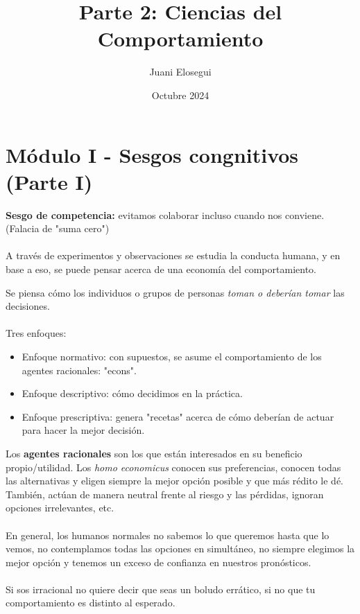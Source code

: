 \documentclass{article}
\title{Parte 2: Ciencias del Comportamiento}
\author{Juani Elosegui}
\date{Octubre 2024}
\begin{document}
\maketitle

    \section*{Módulo I - Sesgos congnitivos (Parte I)}
        \textbf{Sesgo de competencia:} evitamos colaborar incluso cuando nos conviene. (Falacia de "suma cero")
        \\
        \\
        A través de experimentos y observaciones se estudia la conducta humana, y en base a eso, se puede pensar acerca de una economía del comportamiento.

        Se piensa cómo los individuos o grupos de personas \emph{toman o deberían tomar} las decisiones.
        \\
        \\
        Tres enfoques:
        \begin{itemize}
            \item Enfoque normativo: con supuestos, se asume el comportamiento de los agentes racionales: "econs".
            \item Enfoque descriptivo: cómo decidimos en la práctica.
            \item Enfoque prescriptiva: genera "recetas" acerca de cómo deberían de actuar para hacer la mejor decisión.
        \end{itemize}
        Los \textbf{agentes racionales} son los que están interesados en su beneficio propio/utilidad. Los \emph{homo economicus} conocen sus preferencias, conocen todas las alternativas y eligen siempre la mejor opción posible y que más rédito le dé.
        \\
        También, actúan de manera neutral frente al riesgo y las pérdidas, ignoran opciones irrelevantes, etc.
        \\
        \\
        En general, los humanos normales no sabemos lo que queremos hasta que lo vemos, no contemplamos todas las opciones en simultáneo, no siempre elegimos la mejor opción y tenemos un exceso de confianza en nuestros pronósticos.
        \\
        \\
        Si sos irracional no quiere decir que seas un boludo errático, si no que tu comportamiento es distinto al esperado.
        \\
\end{document}
